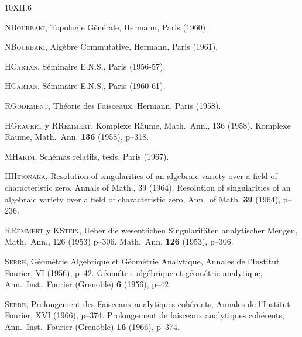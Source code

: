 
\begin{sgabibliography}{10}{XII.6}

 N\ptbl \textsc{Bourbaki},
Topologie Générale, Hermann, Paris (1960).

 N\ptbl \textsc{Bourbaki},
Algèbre Commutative, Hermann, Paris (1961).

 H\ptbl \textsc{Cartan}. Séminaire E.N.S., Paris (1956-57).

 H\ptbl \textsc{Cartan}. Séminaire E.N.S., Paris (1960-61).

 R\ptbl \textsc{Godement}, Théorie des Faisceaux, Hermann, Paris
(1958).

 H\ptbl \textsc{Grauert} y R\ptbl \textsc{Remmert},
  {Komplexe R\"aume, Math.\ Ann., 136 (1958).}
  {Komplexe R\"aume, Math.\ Ann. \textbf{136} (1958), p--318.}

 M\ptbl \textsc{Hakim}, Schémas relatifs, tesis, Paris (1967).

 H\ptbl \textsc{Hironaka},
{Resolution of singularities of an algebraic variety over a field of characteristic zero, Annals of Math., 39 (1964).}
{Resolution of singularities of an algebraic variety over a field of characteristic zero, Ann.\ of Math. \textbf{39} (1964), p--236.}

 R\ptbl \textsc{Remmert} y K\ptbl \textsc{Stein},
Ueber die wesentlichen Singularit\"aten analytischer Mengen,
{Math.\ Ann., 126 (1953) p--306.}
{Math.\ Ann. \textbf{126} (1953), p--306.}

%
\textsc{Serre},
{Géométrie Algébrique et Géométrie Analytique, Annales de l'Institut Fourier, VI (1956), p--42.}
{Géométrie algébrique et géométrie analytique, Ann.\ Inst.\ Fourier (Grenoble) \textbf{6} (1956), p--42.}

%
\textsc{Serre},
{Prolongement des Faisceaux analytiques
cohérents, Annales de l'Institut Fourier, XVI (1966), p--374.}
{Prolongement de faisceaux analytiques
cohérents, Ann.\ Inst.\ Fourier (Grenoble) \textbf{16} (1966), p--374.}

\end{sgabibliography}
